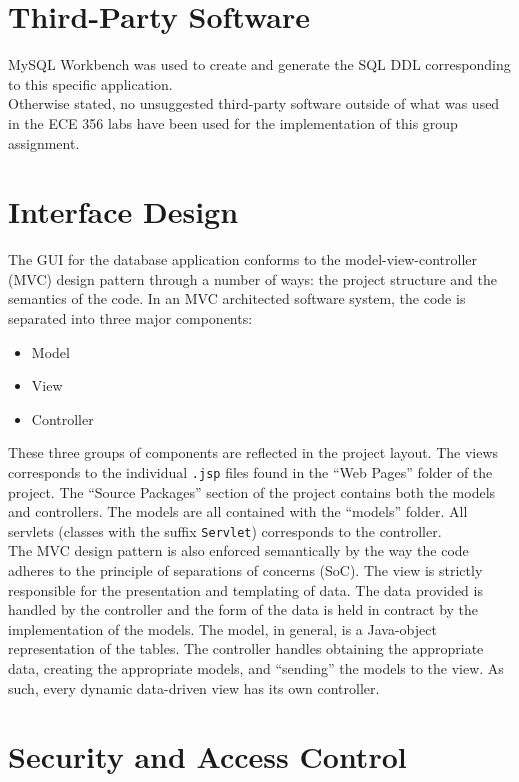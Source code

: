 \documentclass{article}
\begin{document}
\section{Third-Party Software}
MySQL Workbench was used to create and generate the SQL DDL corresponding to this specific application. \\

Otherwise stated, no unsuggested third-party software outside of what was used in the ECE 356 labs have been used for the implementation of this group assignment.

\section{Interface Design}
The GUI for the database application conforms to the model-view-controller (MVC) design pattern through a number of ways: the project structure and the semantics of the code. In an MVC architected software system, the code is separated into three major components:
\begin{itemize}
	\item Model
	\item View
	\item Controller
\end{itemize}
These three groups of components are reflected in the project layout. The views corresponds to the individual \texttt{.jsp} files found in the ``Web Pages'' folder of the project. The ``Source Packages'' section of the project contains both the models and controllers. The models are all contained with the ``models'' folder. All servlets (classes with the suffix \texttt{Servlet}) corresponds to the controller. \\

The MVC design pattern is also enforced semantically by the way the code adheres to the principle of separations of concerns (SoC). The view is strictly responsible for the presentation and templating of data. The data provided is handled by the controller and the form of the data is held in contract by the implementation of the models. The model, in general, is a Java-object representation of the tables. The controller handles obtaining the appropriate data, creating the appropriate models, and ``sending'' the models to the view. As such, every dynamic data-driven view has its own controller.

\section{Security and Access Control}
\end{document}

